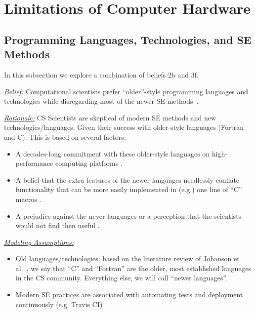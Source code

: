 \documentclass[sigconf,review,anonymous]{acmart}
\newcommand{\bi}{\begin{itemize}}
\newcommand{\ei}{\end{itemize}}
\begin{document}
\section{Limitations of Computer Hardware}


\subsection{Programming Languages, Technologies, and SE Methods }
In this subsection we explore a combination of beliefs 2b and 3f.

\noindent \textit{\underline{Belief:}} Computational scientists prefer
 ``older''-style programming languages and technologies while disregarding most of the newer SE methods~\cite{basili08_hpc, carver07_environment, Prabhu11_cssurvey, kendall05_C, ragan14_pythoncs}.   

\noindent \textit{\underline{Rationale:}} CS Scientists are skeptical of modern SE methods and new technologies/languages.
Given their success with   older-style languages
(Fortran and C).  This is based on several factors: 
\begin{itemize}
    \item A decades-long commitment with these older-style languages on high-performance computing platforms \cite{faulk09_secs}.
     \item A  belief that the extra features of the newer
     languages needlessly conflate functionality that can be
     more easily implemented in (e.g.) one line of ``C'' macros  \cite{sanders08_risk}. 
    \item A prejudice against the never languages or a perception that the scientists would not find then useful \cite{Prabhu11_cssurvey}.  
\end{itemize}

\noindent \textit{\underline{Modeling Assumptions:}} 
\bi
\item Old languages/technologies: based on the literature review of Johanson et al.~\cite{johan18_secs}, we say that ``C''
and ``Fortran'' are the older, most established languages in the CS community. 
Everything else, we will call ``newer languages''.
\item Modern SE practices are associated with automating tests and deployment continuously (e.g. Travis CI) 
\ei
\end{document}
